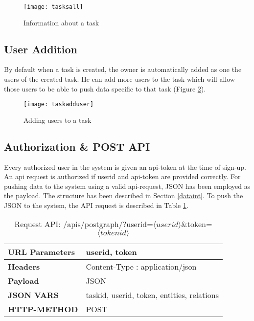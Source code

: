 \begin{figure}[H]
\begin{center}  
\texttt{[image: tasksall]} 
\caption{Information about a task}
\label{fig:tasksall}
\end{center}
\end{figure}


\subsection{User Addition}
By default when a task is created, the owner is automatically added as one the users of the created task.
He can add more users to the task which will allow those users to be able to push data specific to that task (Figure \ref{fig:taskadduser}).

\begin{figure}[H]
\begin{center}  
\texttt{[image: taskadduser]} 
\caption{Adding users to a task}
\label{fig:taskadduser}
\end{center}
\end{figure}


\subsection{Authorization \& POST API}
Every authorized user in the system is given an api-token at the time of sign-up. An api request is authorized if userid and api-token are provided correctly. For pushing data to the system using a valid api-request, JSON has been employed as the payload. The structure has been described in Section \ref{dataint}. To push the JSON to the system, the API request is described in Table \ref{tab:postjson}.

\begin{table}[H]
\centering
\caption{Request API: /apis/postgraph/?userid=$\langle userid \rangle$\&token=$\langle tokenid \rangle$}
\label{tab:postjson}
\begin{tabular}{ll}

\textbf{URL Parameters} & userid, token                              \\

\hline

\textbf{Headers}        & Content-Type : application/json            \\

\hline

\textbf{Payload}        & JSON                                       \\

\hline

\textbf{JSON VARS}      & taskid, userid, token, entities, relations \\
\hline

\textbf{HTTP-METHOD}    & POST      \\
\hline                                

\end{tabular}
\end{table}

